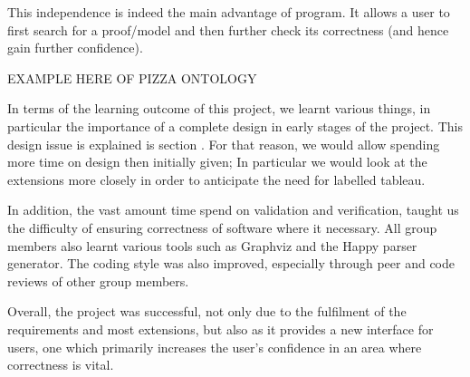 This independence is indeed the main advantage of program. It allows a user to first search for a proof/model and then further check its correctness (and hence gain further confidence).

EXAMPLE HERE OF PIZZA ONTOLOGY

In terms of the learning outcome of this project, we learnt various things, in particular the importance of a complete design in early stages of the project. This design issue is explained is section \label{sec:valandconc}. For that reason, we would allow spending more time on design then initially given; In particular we would look at the extensions more closely in order to anticipate the need for labelled tableau.

In addition, the vast amount time spend on validation and verification, taught us the difficulty of ensuring correctness of software where it necessary. All group members also learnt various tools such as Graphviz and the Happy parser generator. The coding style was also improved, especially through peer and code reviews of other group members. 

Overall, the project was successful, not only due to the fulfilment of the requirements and most extensions, but also as it provides a new interface for users, one which primarily increases the user's confidence in an area where correctness is vital. 


